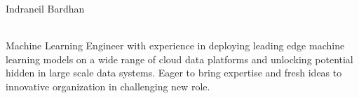 \documentclass[hidelinks, 10pt, A4]{article} %
\begin{document}
\centerline{{\Huge Indraneil Bardhan}}  %

\noindent
{\color{mygray} \hrulefill }
\medskip

\noindent {\Large \textcolor{sectcol}{ Summary}} \hspace{5pt} %
\medskip
\noindent
\\
Machine Learning Engineer with experience in deploying leading edge machine learning models on a wide range of cloud data platforms and unlocking potential hidden in large scale data systems. Eager to bring expertise and fresh ideas to innovative organization in challenging new role.
\\ 
\medskip
{\color{mygray} \hrulefill }
\end{document}
